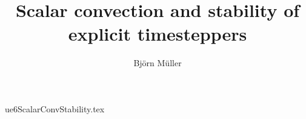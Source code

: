 \documentclass[10pt,a4paper]{article}
\title{Scalar convection and stability of explicit timesteppers}
\author{Björn Müller}
\begin{document}
\maketitle

{ue6ScalarConvStability.tex}
\end{document}

